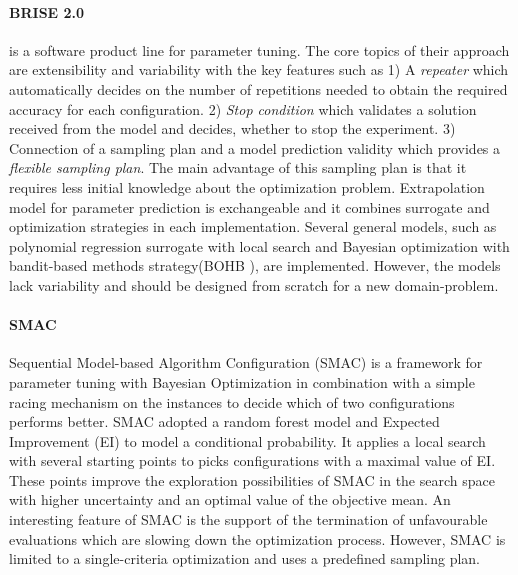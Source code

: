 
        \paragraph{BRISE 2.0}\label{alg:BRISE} \cite{Pukhkaiev19} is a software product line for parameter tuning. The core topics of their approach are extensibility and variability with the key features such as 1) A \emph{repeater} which automatically decides on the number of repetitions needed to obtain the required accuracy for each configuration. 2) \emph{Stop condition} which validates a solution received from the model and decides, whether to stop the experiment. 3) Connection of a sampling plan and a model prediction validity which provides a \emph{flexible sampling plan}. The main advantage of this sampling plan is that it requires less initial knowledge about the optimization problem.
        Extrapolation model for parameter prediction is exchangeable and it combines surrogate and optimization strategies in each implementation. Several general models, such as polynomial regression surrogate with local search and Bayesian optimization with bandit-based methods strategy(BOHB \cite{FalknerBOHB}), are implemented.  However, the models lack variability and should be designed from scratch for a new domain-problem.

        \paragraph{SMAC} Sequential Model-based Algorithm Configuration (SMAC)\cite{HutterHL11, smac-2017} is a framework for parameter tuning with Bayesian Optimization in combination with a simple racing mechanism on the instances to decide which of two configurations performs better.
        SMAC adopted a random forest model and Expected Improvement (EI) to model a conditional probability. It applies a local search with several starting points to picks configurations with a maximal value of EI. These points improve the exploration possibilities of SMAC in the search space with higher uncertainty and an optimal value of the objective mean. 
        An interesting feature of SMAC is the support of the termination of unfavourable evaluations which are slowing down the optimization process. However, SMAC is limited to a single-criteria optimization and uses a predefined sampling plan.

